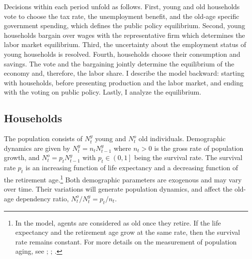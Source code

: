 Decisions within each period unfold as follows. First, young and old households vote to choose the tax rate, the unemployment benefit, and the old-age specific government spending, which defines the public policy equilibrium. 
Second, young households bargain over wages with the representative firm which determines the labor market equilibrium. 
Third, the uncertainty about the employment status of young households is resolved. 
Fourth, households choose their consumption and savings.
The vote and the bargaining jointly determine the equilibrium of the economy and, therefore, the labor share. I describe the model backward: starting with households, before presenting production and the labor market, and ending with the voting on public policy. Lastly, I analyze the equilibrium.

\subsection{Households}\label{chap1-households}

The population consists of $N^y_t$ young and $N^o_t$ old individuals. Demographic dynamics are given by $N^y_t = n_t N^y_{t-1}$ where $n_t > 0$ is the gross rate of population growth, and $N^o_t = p_t N^y_{t-1}$ with $p_t \in \left(0,1\right]$ being the survival rate. The survival rate $p_t$ is an increasing function of life expectancy and a decreasing function of the retirement age.\footnote{In the model, agents are considered as old once they retire. If the life expectancy and the retirement age grow at the same rate, then the survival rate remains constant. For more details on the measurement of population aging, see \citet{Sanderson2007Perspective}; \citet{Sanderson2013Characteristics}; \citet{DAlbis2013Age}.} Both demographic parameters are exogenous and may vary over time. Their variations will generate population dynamics, and affect the old-age dependency ratio, $N^o_t/N^y_t = p_t/n_t$. 

